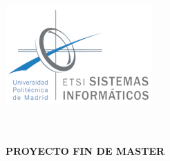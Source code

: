 \begin{titlepage}
\begin{center}

\begin{flushleft}
 \includegraphics[width=0.35\linewidth]{imgs/logo-etsisi.png}  \\[0.5 cm]
\end{flushleft}

\LARGE \MASTERNAME \\ [1 cm]

\Huge \textsc{\TFM}\\[1 cm]

\LARGE \textbf{PROYECTO FIN DE MASTER}\\[1 cm]

\LARGE \ME \\[1 cm]


\LARGE

\vfill

{\large \DATE}

\end{center}
\end{titlepage}